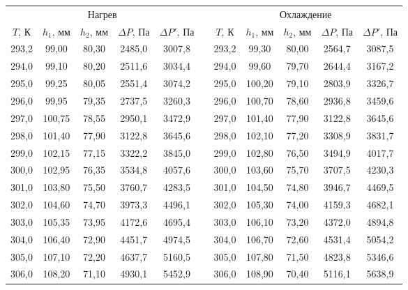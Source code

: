 \documentclass[a4paper,12pt]{article} %
\begin{document}
\begin{table}[H]
	\centering
	\begin{tabular}{|c|c|c|c|c|c|c|c|c|c|c|}
		\cline{1-5} \cline{7-11}
		\multicolumn{5}{|c|}{Нагрев} &  & \multicolumn{5}{c|}{Охлаждение} \\ \cline{1-5} \cline{7-11} 
		$ T $, К & $ h_1 $, мм & $ h_2 $, мм & $ \Delta P $, Па & $ \Delta P' $, Па &  & $ T $, К & $ h_1 $, мм & $ h_2 $, мм & $ \Delta P $, Па & $ \Delta P' $, Па \\ \cline{1-5} \cline{7-11} 
		293,2 & 99,00 & 80,30 & 2485,0 & 3007,8 &  & 293,2 & 99,30 & 80,00 & 2564,7 & 3087,5 \\ \cline{1-5} \cline{7-11} 
		294,0 & 99,10 & 80,20 & 2511,6 & 3034,4 &  & 294,0 & 99,60 & 79,70 & 2644,4 & 3167,2 \\ \cline{1-5} \cline{7-11} 
		295,0 & 99,25 & 80,05 & 2551,4 & 3074,2 &  & 295,0 & 100,20 & 79,10 & 2803,9 & 3326,7 \\ \cline{1-5} \cline{7-11} 
		296,0 & 99,95 & 79,35 & 2737,5 & 3260,3 &  & 296,0 & 100,70 & 78,60 & 2936,8 & 3459,6 \\ \cline{1-5} \cline{7-11} 
		297,0 & 100,75 & 78,55 & 2950,1 & 3472,9 &  & 297,0 & 101,40 & 77,90 & 3122,8 & 3645,6 \\ \cline{1-5} \cline{7-11} 
		298,0 & 101,40 & 77,90 & 3122,8 & 3645,6 &  & 298,0 & 102,10 & 77,20 & 3308,9 & 3831,7 \\ \cline{1-5} \cline{7-11} 
		299,0 & 102,15 & 77,15 & 3322,2 & 3845,0 &  & 299,0 & 102,80 & 76,50 & 3494,9 & 4017,7 \\ \cline{1-5} \cline{7-11} 
		300,0 & 102,95 & 76,35 & 3534,8 & 4057,6 &  & 300,0 & 103,60 & 75,70 & 3707,5 & 4230,3 \\ \cline{1-5} \cline{7-11} 
		301,0 & 103,80 & 75,50 & 3760,7 & 4283,5 &  & 301,0 & 104,50 & 74,80 & 3946,7 & 4469,5 \\ \cline{1-5} \cline{7-11} 
		302,0 & 104,60 & 74,70 & 3973,3 & 4496,1 &  & 302,0 & 105,30 & 74,00 & 4159,3 & 4682,1 \\ \cline{1-5} \cline{7-11} 
		303,0 & 105,35 & 73,95 & 4172,6 & 4695,4 &  & 303,0 & 106,10 & 73,20 & 4372,0 & 4894,8 \\ \cline{1-5} \cline{7-11} 
		304,0 & 106,40 & 72,90 & 4451,7 & 4974,5 &  & 304,0 & 106,70 & 72,60 & 4531,4 & 5054,2 \\ \cline{1-5} \cline{7-11} 
		305,0 & 107,10 & 72,20 & 4637,7 & 5160,5 &  & 305,0 & 107,80 & 71,50 & 4823,8 & 5346,6 \\ \cline{1-5} \cline{7-11} 
		306,0 & 108,20 & 71,10 & 4930,1 & 5452,9 &  & 306,0 & 108,90 & 70,40 & 5116,1 & 5638,9 \\ \cline{1-5} \cline{7-11} 

\end{tabular}
\end{table}
\end{document}
